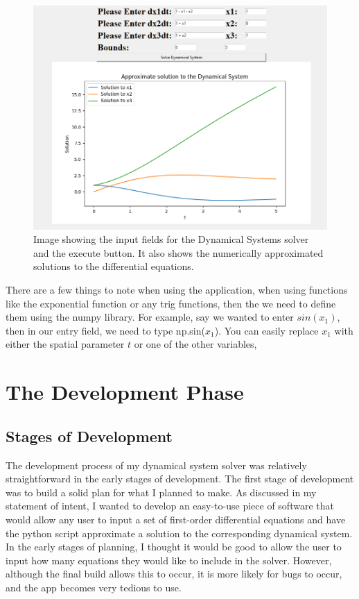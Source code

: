 \documentclass[12pt]{report}
\begin{document}
\begin{figure}[H]
    \centering
    \includegraphics[scale = 0.7]{demo 2.png}
    \caption{Image showing the input fields for the Dynamical Systems solver and the execute button. It also shows the numerically approximated solutions to the differential equations.}
    \label{GUI solution}
\end{figure}
There are a few things to note when using the application, when using functions like the exponential function or any trig functions, then the we need to define them using the numpy library. For example, say we wanted to enter $sin(x_{1})$, then in our entry field, we need to type np.sin($x_{1}$). You can easily replace $x_{1}$ with either the spatial parameter $t$ or one of the other variables,
\chapter{The Development Phase}
\section{Stages of Development}
The development process of my dynamical system solver was relatively straightforward in the early stages of development. The first stage of development was to build a solid plan for what I planned to make. As discussed in my statement of intent, I wanted to develop an easy-to-use piece of software that would allow any user to input a set of first-order differential equations and have the python script approximate a solution to the corresponding dynamical system. In the early stages of planning, I thought it would be good to allow the user to input how many equations they would like to include in the solver. However, although the final build allows this to occur, it is more likely for bugs to occur, and the app becomes very tedious to use.
\smallskip
\end{document}
